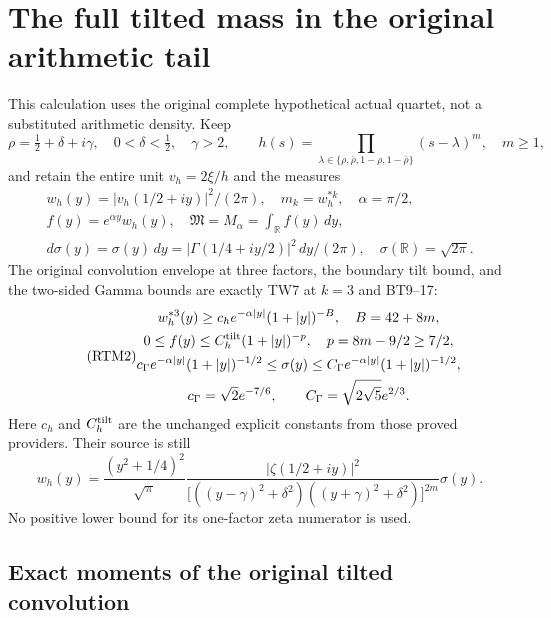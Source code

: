 \section{The full tilted mass in the original arithmetic tail}
\label{sec:retained-tilted-mass-tail}

This calculation uses the original complete hypothetical actual quartet,
not a substituted arithmetic density.  Keep
\[
 \rho=\tfrac12+\delta+i\gamma,\quad0<\delta<\tfrac12,\quad\gamma>2,
 \qquad h(s)=\prod_{\lambda\in\{\rho,\bar\rho,1-\rho,1-\bar\rho\}}
 (s-\lambda)^m,\quad m\ge1,
\]
and retain the entire unit $v_h=2\xi/h$ and the measures
\begin{equation}\tag{RTM1}
 \begin{gathered}
 w_h(y)=|v_h(1/2+iy)|^2/(2\pi),\quad m_k=w_h^{*k},\quad
 \alpha=\pi/2,\\ f(y)=e^{\alpha y}w_h(y),\quad
 \mathfrak M=M_\alpha=\int_{\mathbb R}f(y)\,dy,\\
 d\sigma(y)=\sigma(y)\,dy
 =|\Gamma(1/4+iy/2)|^2\,dy/(2\pi),\quad
 \sigma(\mathbb R)=\sqrt{2\pi}.
 \end{gathered}
\end{equation}
The original convolution envelope at three factors, the boundary tilt
bound, and the two-sided Gamma bounds are exactly TW7 at $k=3$ and
BT9--17:
\begin{equation}\tag{RTM2}
 \begin{gathered}
 w_h^{*3}(y)\ge c_h e^{-\alpha|y|}(1+|y|)^{-B},\quad B=42+8m,\\
 0\le f(y)\le C_h^{\rm tilt}(1+|y|)^{-p},\quad p=8m-9/2\ge7/2,\\
 c_\Gamma e^{-\alpha|y|}(1+|y|)^{-1/2}
 \le\sigma(y)\le C_\Gamma e^{-\alpha|y|}(1+|y|)^{-1/2},\\
 c_\Gamma=\sqrt2e^{-7/6},\qquad
 C_\Gamma=\sqrt{2\sqrt5}e^{2/3}.
 \end{gathered}
\end{equation}
Here $c_h$ and $C_h^{\rm tilt}$ are the unchanged explicit constants
from those proved providers.  Their source is still
\[
 w_h(y)=\frac{(y^2+1/4)^2}{\sqrt\pi}
 \frac{|\zeta(1/2+iy)|^2}
 {\bigl[((y-\gamma)^2+\delta^2)((y+\gamma)^2+\delta^2)\bigr]^{2m}}
 \sigma(y).
\]
No positive lower bound for its one-factor zeta numerator is used.

\subsection{Exact moments of the original tilted convolution}

